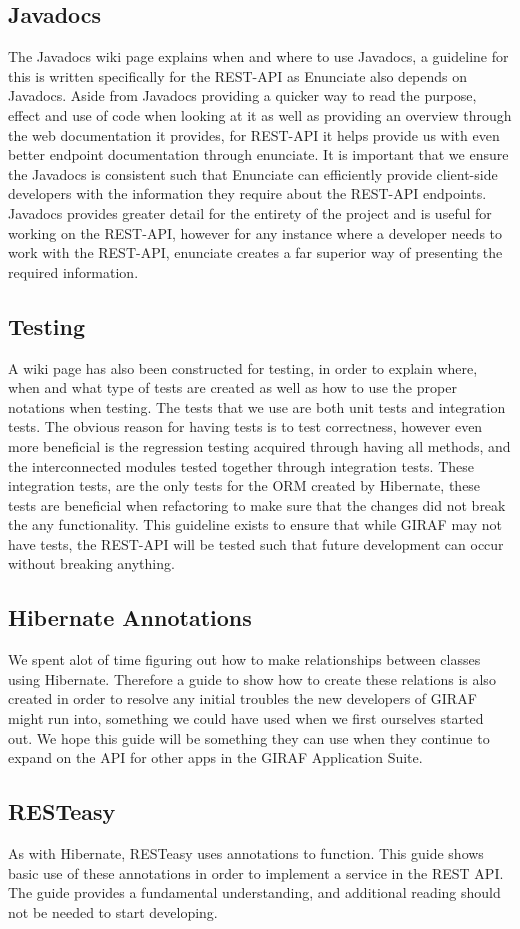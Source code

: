 \subsection{Javadocs}
The Javadocs wiki page explains when and where to use Javadocs, a guideline for this is written specifically for the REST-API as Enunciate also depends on Javadocs.
Aside from Javadocs providing a quicker way to read the purpose, effect and use of code when looking at it as well as providing an overview through the web documentation it provides, for REST-API it helps provide us with even better endpoint documentation through enunciate.
It is important that we ensure the Javadocs is consistent such that Enunciate can efficiently provide client-side developers with the information they require about the REST-API endpoints.
Javadocs provides greater detail for the entirety of the project and is useful for working on the REST-API, however for any instance where a developer needs to work with the REST-API, enunciate creates a far superior way of presenting the required information.

\subsection{Testing}
A wiki page has also been constructed for testing, in order to explain where, when and what type of tests are created as well as how to use the proper notations when testing.
The tests that we use are both unit tests and integration tests.
The obvious reason for having tests is to test correctness, however even more beneficial is the regression testing acquired through having all methods, and the interconnected modules tested together through integration tests.
These integration tests, are the only tests for the ORM created by Hibernate, these tests are beneficial when refactoring to make sure that the changes did not break the any functionality.
This guideline exists to ensure that while GIRAF may not have tests, the REST-API will be tested such that future development can occur without breaking anything.

\subsection{Hibernate Annotations}
We spent alot of time figuring out how to make relationships between classes using Hibernate.
Therefore a guide to show how to create these relations is also created in order to resolve any initial troubles the new developers of GIRAF might run into, something we could have used when we first ourselves started out.
We hope this guide will be something they can use when they continue to expand on the API for other apps in the GIRAF Application Suite.

\subsection{RESTeasy}
As with Hibernate, RESTeasy uses annotations to function.
This guide shows basic use of these annotations in order to implement a service in the REST API.
The guide provides a fundamental understanding, and additional reading should not be needed to start developing.
